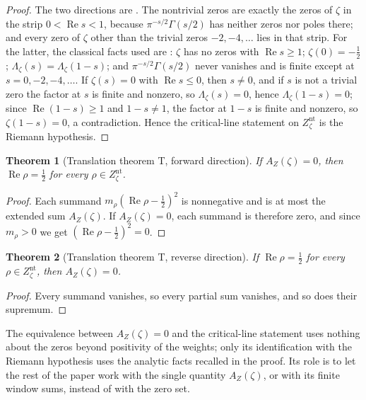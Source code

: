 \documentclass[11pt]{article}
\DeclareMathOperator{\Real}{Re}
\newcommand{\Lzeta}{\Lambda_{\zeta}}
\newcommand{\Znt}{Z_{\zeta}^{\mathrm{nt}}}
\newcommand{\AZ}{A_{Z}(\zeta)}
\newtheorem{theorem}{Theorem}[section]
\theoremstyle{definition}
\begin{document}
\begin{proof}
The two directions are
.  The
nontrivial zeros are exactly the zeros of \(\zeta\) in the strip
\(0<\Real s<1\), because \(\pi^{-s/2}\Gamma(s/2)\) has neither zeros
nor poles there; and every zero of \(\zeta\) other than the trivial zeros \(-2,-4,\ldots\)
lies in that strip.  For the latter, the classical facts used are
\citep{TitchmarshHeathBrown1986}: \(\zeta\) has no zeros with
\(\Real s\geq1\); \(\zeta(0)=-\frac12\); \(\Lzeta(s)=\Lzeta(1-s)\); and
\(\pi^{-s/2}\Gamma(s/2)\) never vanishes and is finite except at
\(s=0,-2,-4,\ldots\).  If \(\zeta(s)=0\) with \(\Real s\leq0\), then
\(s\neq0\), and if \(s\) is not a trivial zero the factor at \(s\) is
finite and nonzero, so \(\Lzeta(s)=0\), hence \(\Lzeta(1-s)=0\); since
\(\Real(1-s)\geq1\) and \(1-s\neq1\), the factor at \(1-s\) is finite and
nonzero, so \(\zeta(1-s)=0\), a contradiction.  Hence the critical-line
statement on \(\Znt\) is the Riemann hypothesis.
\end{proof}

\begin{theorem}[Translation theorem T, forward direction]
\label{thm:rh:translation-T-forward}
If \(\AZ=0\), then \(\Real\rho=\frac12\) for every \(\rho\in\Znt\).
\end{theorem}

\begin{proof}
Each summand \(m_\rho(\Real\rho-\frac12)^2\) is nonnegative and is at
most the extended sum \(\AZ\).  If \(\AZ=0\), each summand is therefore
zero, and since \(m_\rho>0\) we get \((\Real\rho-\frac12)^2=0\).
\end{proof}

\begin{theorem}[Translation theorem T, reverse direction]
\label{thm:rh:translation-T-reverse}
If \(\Real\rho=\frac12\) for every \(\rho\in\Znt\), then \(\AZ=0\).
\end{theorem}

\begin{proof}
Every summand vanishes, so every partial sum vanishes, and so does
their supremum.
\end{proof}

The equivalence between \(\AZ=0\) and the critical-line statement uses
nothing about the zeros beyond positivity of the weights; only its
identification with the Riemann hypothesis uses the analytic facts
recalled in the proof.  Its role is to let the rest of the paper work with the single
quantity \(\AZ\), or with its finite window sums, instead of with the
zero set.
\end{document}
